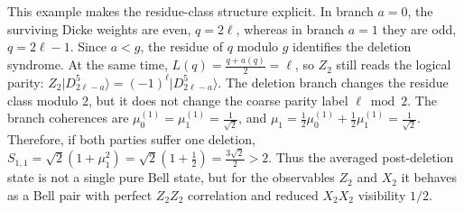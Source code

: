 \documentclass[aps,prl,reprint,superscriptaddress,nofootinbib]{revtex4-2}
\newcommand{\ket}[1]{\lvert #1\rangle}
\begin{document}
This example makes the residue-class structure explicit.  In branch $a=0$,
the surviving Dicke weights are even, $q=2\ell$, whereas in branch $a=1$
they are odd, $q=2\ell-1$.  Since $a<g$, the residue of $q$ modulo $g$
identifies the deletion syndrome.  At the same time,
$L(q)=\frac{q+a(q)}{2}=\ell$,
so $Z_2$ still reads the logical parity:
$Z_2\ket{D_{2\ell-a}^{5}}
=
(-1)^\ell\ket{D_{2\ell-a}^{5}}$.
The deletion branch changes the residue class modulo $2$, but it does not
change the coarse parity label $\ell\bmod2$.
%
The branch coherences are 
$\mu_0^{(1)}=\mu_1^{(1)}=\frac{1}{\sqrt2}$,
and $\mu_1=\frac12\mu_0^{(1)}+\frac12\mu_1^{(1)}
=
\frac{1}{\sqrt2}$.
Therefore, if both parties suffer one deletion,
$S_{1,1}
=
\sqrt2\left(1+\mu_1^2\right)
=
\sqrt2\left(1+\frac12\right)
=
\frac{3\sqrt2}{2}>2$.
Thus the averaged post-deletion state is not a single pure Bell state, but
for the observables $Z_2$ and $X_2$ it behaves as a Bell pair with perfect
$Z_2Z_2$ correlation and reduced $X_2X_2$ visibility $1/2$.
\end{document}
